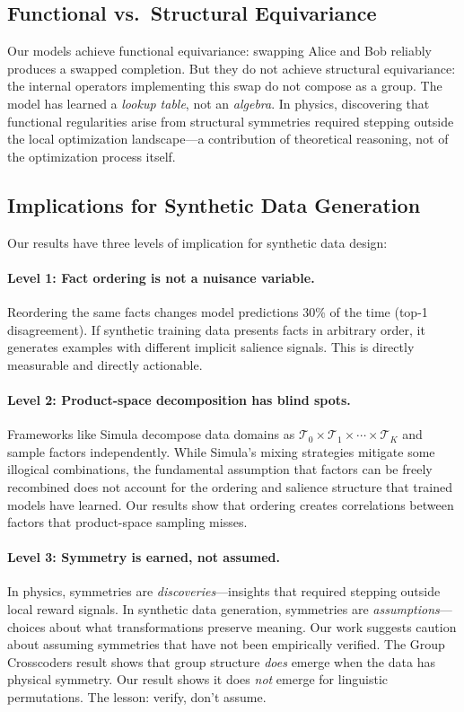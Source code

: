 \documentclass[10pt, letterpaper]{article}
\begin{document}
\subsection{Functional vs.\ Structural Equivariance}

Our models achieve functional equivariance: swapping Alice and Bob reliably produces a swapped completion. But they do not achieve structural equivariance: the internal operators implementing this swap do not compose as a group. The model has learned a \emph{lookup table}, not an \emph{algebra}. In physics, discovering that functional regularities arise from structural symmetries required stepping outside the local optimization landscape---a contribution of theoretical reasoning, not of the optimization process itself.

\subsection{Implications for Synthetic Data Generation}

Our results have three levels of implication for synthetic data design:

\paragraph{Level 1: Fact ordering is not a nuisance variable.} Reordering the same facts changes model predictions 30\% of the time (top-1 disagreement). If synthetic training data presents facts in arbitrary order, it generates examples with different implicit salience signals. This is directly measurable and directly actionable.

\paragraph{Level 2: Product-space decomposition has blind spots.} Frameworks like Simula \cite{davidson2026simula} decompose data domains as $\mathcal{T}_0 \times \mathcal{T}_1 \times \cdots \times \mathcal{T}_K$ and sample factors independently. While Simula's mixing strategies mitigate some illogical combinations, the fundamental assumption that factors can be freely recombined does not account for the ordering and salience structure that trained models have learned. Our results show that ordering creates correlations between factors that product-space sampling misses.

\paragraph{Level 3: Symmetry is earned, not assumed.} In physics, symmetries are \emph{discoveries}---insights that required stepping outside local reward signals. In synthetic data generation, symmetries are \emph{assumptions}---choices about what transformations preserve meaning. Our work suggests caution about assuming symmetries that have not been empirically verified. The Group Crosscoders result shows that group structure \emph{does} emerge when the data has physical symmetry. Our result shows it does \emph{not} emerge for linguistic permutations. The lesson: verify, don't assume.
\end{document}
